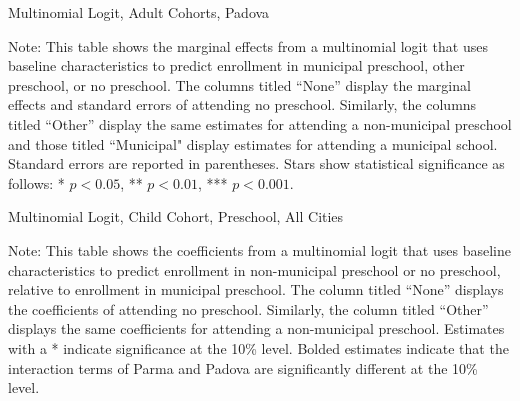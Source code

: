 \begin{table}[H]
\centering
\caption{Multinomial Logit, Adult Cohorts, Padova} \label{mlogit-adult-PD}
\begin{threeparttable}

\begin{tablenotes}
\footnotesize\raggedright{Note: This table shows the marginal effects from a multinomial logit that uses baseline characteristics to predict enrollment in municipal preschool, other preschool, or no preschool. The columns titled ``None'' display the marginal effects and standard errors of attending no preschool. Similarly, the columns titled ``Other'' display the same estimates for attending a non-municipal preschool and those titled ``Municipal" display estimates for attending a municipal school. Standard errors are reported in parentheses. Stars show statistical significance as follows: * $p < 0.05$, ** $p < 0.01$, *** $p < 0.001$.}
\end{tablenotes}
\end{threeparttable}
\end{table}

\begin{table}[H]
\centering
\caption{Multinomial Logit, Child Cohort, Preschool, All Cities} \label{mlogit_coeff_child}
\begin{threeparttable}

\begin{tablenotes}
\footnotesize\raggedright{Note: This table shows the coefficients from a multinomial logit that uses baseline characteristics to predict enrollment in non-municipal preschool or no preschool, relative to enrollment in municipal preschool. The column titled ``None'' displays the coefficients of attending no preschool. Similarly, the column titled ``Other'' displays the same coefficients for attending a non-municipal preschool. Estimates with a * indicate significance at the 10\% level. Bolded  estimates indicate that the interaction terms of Parma and Padova are significantly different at the 10\% level.}
\end{tablenotes}
\end{threeparttable}
\end{table}


